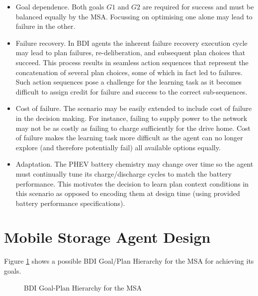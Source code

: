 \documentclass[a4paper]{article}
\begin{document}
\begin{itemize}

\item Goal dependence. Both goals $G1$ and $G2$ are required for success and must be balanced equally by the MSA. Focussing on optimising one alone may lead to failure in the other. 

\item Failure recovery. In BDI agents the inherent failure recovery execution cycle may lead to plan failures, re-deliberation, and subsequent plan choices that succeed. This process results in seamless action sequences that represent the concatenation of several plan choices, some of which in fact led to failures. Such action sequences pose a challenge for the learning task as it becomes difficult to assign credit for failure and success to the correct sub-sequences.

\item Cost of failure. The scenario may be easily extended to include cost of failure in the decision making. For instance, failing to supply power to the network may not be as costly as failing to charge sufficiently for the drive home. Cost of failure makes the learning task more difficult as the agent can no longer explore (and therefore potentially fail) all available options equally.

\item Adaptation. The PHEV battery chemistry may change over time so the agent must continually tune its charge/discharge cycles to match the battery performance. This motivates the decision to learn plan context conditions in this scenario as opposed to encoding them at design time (using provided battery performance specifications).

\end{itemize}

\section {Mobile Storage Agent Design}

Figure \ref{fig:gptree} shows a possible BDI Goal/Plan Hierarchy for the MSA for achieving its goals. 

\begin{figure}[htbp]
\begin{changemargin}{-1.7in}{-1.7in}
\begin{center}
\fbox{

}
\end{center}
\caption{BDI Goal-Plan Hierarchy for the MSA}
\label{fig:gptree}
\end{changemargin}
\end{figure}



 
\end{document}
